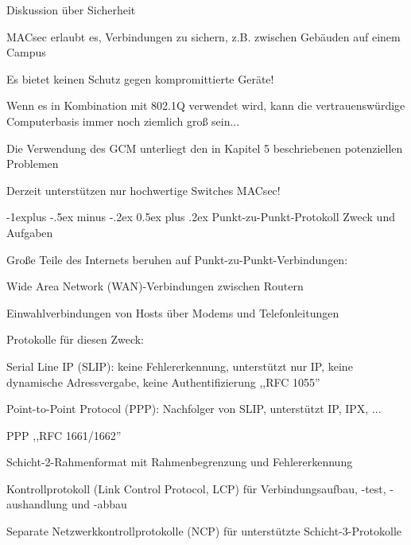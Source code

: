 \documentclass[a4paper]{article}
\makeatletter
\renewcommand{\subsection}{\@startsection{subsection}{2}{0mm}%
 {-1explus -.5ex minus -.2ex}%
 {0.5ex plus .2ex}%
 {\normalfont\normalsize\bfseries}}
\makeatother
\begin{document}
\begin{multicols}{3}
      Diskussion über Sicherheit
      \begin{itemize*}
            \item MACsec erlaubt es, Verbindungen zu sichern, z.B. zwischen Gebäuden auf einem Campus
            \item Es bietet keinen Schutz gegen kompromittierte Geräte!
            \begin{itemize*}
                  \item Wenn es in Kombination mit 802.1Q verwendet wird, kann die vertrauenswürdige Computerbasis immer noch ziemlich groß sein...
                  \item Die Verwendung des GCM unterliegt den in Kapitel 5 beschriebenen potenziellen Problemen
                  \item Derzeit unterstützen nur hochwertige Switches MACsec!
            \end{itemize*}
      \end{itemize*}

      \subsection{Punkt-zu-Punkt-Protokoll}
      Zweck und Aufgaben
      \begin{itemize*}
            \item Große Teile des Internets beruhen auf Punkt-zu-Punkt-Verbindungen:
            \begin{itemize*}
                  \item Wide Area Network (WAN)-Verbindungen zwischen Routern
                  \item Einwahlverbindungen von Hosts über Modems und Telefonleitungen
            \end{itemize*}
            \item Protokolle für diesen Zweck:
            \begin{itemize*}
                  \item Serial Line IP (SLIP): keine Fehlererkennung, unterstützt nur IP, keine dynamische Adressvergabe, keine Authentifizierung ,,RFC 1055''
                  \item Point-to-Point Protocol (PPP): Nachfolger von SLIP, unterstützt IP, IPX, ...
            \end{itemize*}
            \item PPP ,,RFC 1661/1662''
            \begin{itemize*}
                  \item Schicht-2-Rahmenformat mit Rahmenbegrenzung und Fehlererkennung
                  \item Kontrollprotokoll (Link Control Protocol, LCP) für Verbindungsaufbau, -test, -aushandlung und -abbau
                  \item Separate Netzwerkkontrollprotokolle (NCP) für unterstützte Schicht-3-Protokolle
            \end{itemize*}
      \end{itemize*}


\end{multicols}
\end{document}
